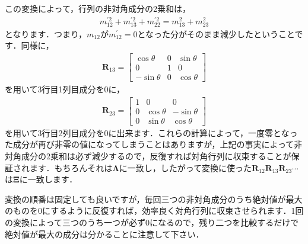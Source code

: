 ﻿\documentclass[a4paper]{jsarticle}
\begin{document}
この変換によって，行列の非対角成分の2乗和は，
\begin{align*}
m_{12}^{\prime 2}+m_{13}^{\prime 2}+m_{22}^{\prime 2}=m_{13}^{2}+m_{23}^{2}
\end{align*}
となります．つまり，$m_{12}$が$m_{12}^{\prime}=0$となった分がそのまま減少したということです．同様に，
\begin{align*}
\boldsymbol{R}_{13}=\begin{bmatrix}
 \cos\theta & 0 & \sin\theta \\
 0 & 1 & 0 \\
-\sin\theta & 0 & \cos\theta
\end{bmatrix}
\end{align*}
を用いて3行目1列目成分を0に，
\begin{align*}
\boldsymbol{R}_{23}=\begin{bmatrix}
1 & 0 & 0 \\
0 & \cos\theta &-\sin\theta \\
0 & \sin\theta & \cos\theta
\end{bmatrix}
\end{align*}
を用いて3行目2列目成分を0に出来ます．これらの計算によって，一度零となった成分が再び非零の値になってしまうことはありますが，上記の事実によって非対角成分の2乗和は必ず減少するので，反復すれば対角行列に収束することが保証されます．もちろんそれは$\boldsymbol{\Lambda}$に一致し，したがって変換に使った$\boldsymbol{R}_{12}\boldsymbol{R}_{13}\boldsymbol{R}_{23}\cdots$は$\boldsymbol{\Xi}$に一致します．

変換の順番は固定しても良いですが，毎回三つの非対角成分のうち絶対値が最大のものを0にするように反復すれば，効率良く対角行列に収束させられます．1回の変換によって三つのうち一つが必ず0になるので，残り二つを比較するだけで絶対値が最大の成分は分かることに注意して下さい．
\end{document}
